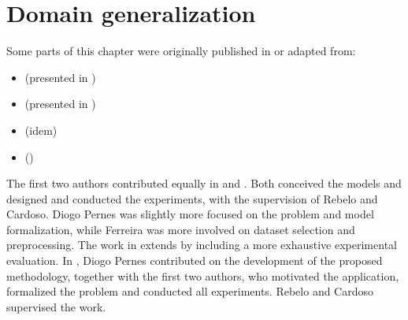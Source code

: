 
\chapter{Domain generalization}


\label{chp:domain_generalization}


\begin{tcolorbox}
	\small{
		Some parts of this chapter were originally published in or adapted from:
		\begin{itemize}
			\item[] \cite{DeSIRe}  (presented in )
			\item[] \cite{AdvSInvConf}  (presented in )
			\item[] \cite{AdvSInvJournal}  (idem)
			\item[] \cite{AdvInvAttack}  ()
		\end{itemize}

		The first two authors contributed equally in \cite{DeSIRe} and \cite{AdvSInvConf}. Both conceived the models and designed and conducted the experiments, with the supervision of Rebelo and Cardoso. Diogo Pernes was slightly more focused on the problem and model formalization, while Ferreira was more involved on dataset selection and preprocessing. The work in \cite{AdvSInvJournal} extends \cite{AdvSInvConf} by including a more exhaustive experimental evaluation. In \cite{AdvInvAttack}, Diogo Pernes contributed on the development of the proposed methodology, together with the first two authors, who motivated the application, formalized the problem and conducted all experiments. Rebelo and Cardoso supervised the work.
	}
\end{tcolorbox}


